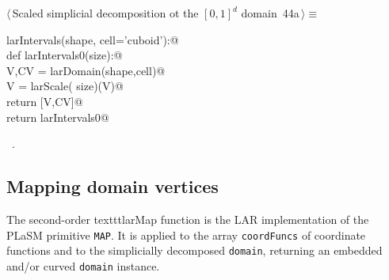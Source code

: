 \documentclass[11pt,oneside]{article}	%
\begin{document}
\begin{flushleft} \small \label{scrap71}
\protect{}$\langle\,$Scaled simplicial decomposition ot the $[0,1]^d$ domain\nobreak\ {\footnotesize 44a}$\,\rangle\equiv$
\vspace{-1ex}
\begin{list}{}{} \item
\mbox{}\verb@def larIntervals(shape, cell='cuboid'):@\\
\mbox{}\verb@   def larIntervals0(size):@\\
\mbox{}\verb@      V,CV = larDomain(shape,cell)@\\
\mbox{}\verb@      V = larScale( size)(V)@\\
\mbox{}\verb@      return [V,CV]@\\
\mbox{}\verb@   return larIntervals0@\\
\mbox{}\verb@@{\NWsep}
\end{list}
\vspace{-1ex}
\footnotesize\addtolength{\baselineskip}{-1ex}
\begin{list}{}{\setlength{\itemsep}{-\parsep}\setlength{\itemindent}{-\leftmargin}}
\item \NWtxtMacroRefIn\ .
\end{list}
\end{flushleft}

\subsection{Mapping domain vertices}
The second-order texttt{larMap} function is the LAR implementation of the PLaSM primitive \texttt{MAP}.
It is applied to the array \texttt{coordFuncs} of coordinate functions and to the simplicially decomposed  \texttt{domain}, returning an embedded and/or curved \texttt{domain} instance.
\end{document}
